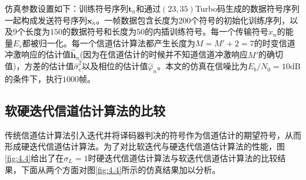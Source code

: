 仿真参数设置如下：训练符号序列$\mathbf{t}_n$和通过$(23,35)$Turbo码生成的数据符号序列一起构成发送符号序列$\mathbf{x}_n$。一帧数据包含长度为$200$个符号的初始化训练序列，以及$9$个长度为$150$的数据符号和长度为$50$的内插训练符号。每一个传输符号$x_n$的能量$E_s$都被归一化。每一个信道估计算法都产生长度为$M={M}'+2=7$的时变信道冲激响应的估计值$\hat{\mathbf{h}}_n$(因为在信道估计的时候并不知道信道冲激响应${M}'$的确切值)，方差的估计值$\hat{\sigma}_e^2$以及相位的估计值$\hat{\varphi}_n$。本文的仿真在信噪比为$E_b/N_0=10\mathrm{dB}$的条件下，执行$1000$帧。
\subsection{软硬迭代信道估计算法的比较}
传统信道估计算法引入迭代并将译码器判决的符号作为信道估计的期望符号，从而形成硬迭代信道估计算法。为了对比软迭代与硬迭代信道估计算法的性能，图\ref{fig:4.4}给出了在$\sigma_L=1$时硬迭代信道估计算法与软迭代信道估计算法的比较结果，下面从两个方面对图\ref{fig:4.4}所示的仿真结果加以分析。

